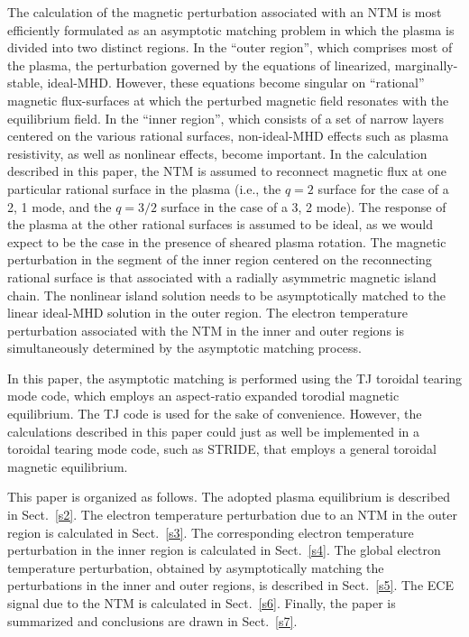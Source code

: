 \documentclass[12pt,prb,aps]{revtex4-1}
\begin{document}
The calculation of the  magnetic perturbation associated with an NTM is most efficiently formulated as an asymptotic matching problem in which the  plasma is  divided into two distinct regions.\cite{tear1,tear2,tear3,tear4,tear5,tear6,tear7,tear8,tear9,tear10}    In the ``outer region'', which comprises most
of the plasma, the perturbation governed by the equations of linearized, marginally-stable, ideal-MHD.
However, these equations become singular on   ``rational'' magnetic flux-surfaces at which the perturbed magnetic field resonates with the equilibrium field. In the ``inner region'', which
consists of a set of narrow layers centered on the various rational surfaces, non-ideal-MHD effects such as plasma resistivity, as well as nonlinear effects,  become important. 
 In the calculation described in this paper, the NTM is assumed to reconnect magnetic flux at one particular rational surface in the plasma (i.e., the
 $q=2$ surface for the case of a 2, 1 mode, and the $q=3/2$ surface in the case of a 3, 2 mode). The response of the plasma at the
 other rational surfaces is assumed to be ideal, as we would expect to be the case in the presence of sheared plasma rotation.\cite{tear5}
The magnetic perturbation in the segment of the inner region centered on the reconnecting rational surface is that associated with a radially asymmetric magnetic island chain.\cite{ntm1,island}
The nonlinear island solution needs to be asymptotically matched to the linear ideal-MHD solution in the outer region. The
electron temperature perturbation associated with the NTM in the inner and outer regions is simultaneously  determined by the asymptotic matching process. 

In this paper, the asymptotic matching is performed using the TJ toroidal tearing mode code,\cite{tear9,tear10}  which employs an aspect-ratio
expanded torodial magnetic equilibrium.\cite{exp} The TJ code is used for the sake of convenience. However, the calculations described in this paper
could just as well be implemented in a toroidal tearing mode code, such as STRIDE,\cite{tear7,tear8} that employs a general toroidal magnetic 
equilibrium. 

This paper is organized as follows. The adopted plasma equilibrium is described in Sect.~\ref{s2}. The electron temperature perturbation due to an NTM 
in the outer region is calculated in Sect.~\ref{s3}. The corresponding electron temperature perturbation in the inner region is calculated in Sect.~\ref{s4}. The
global electron temperature perturbation, obtained by asymptotically matching the perturbations in  the inner and outer regions, is
described in Sect.~\ref{s5}. The ECE signal due to the NTM is calculated in Sect.~\ref{s6}. Finally, the paper is summarized and
conclusions are drawn in Sect.~\ref{s7}. 
\end{document}
